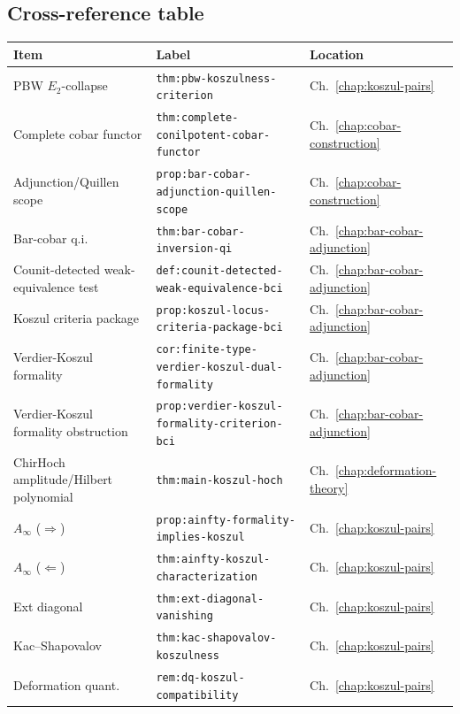 \subsection{Cross-reference table}
\label{subsec:concordance-koszulness-xref}

\begin{center}
\renewcommand{\arraystretch}{1.15}
\begin{tabular}{@{}p{3.6cm}lp{4.5cm}@{}}
\toprule
\textbf{Item} & \textbf{Label} & \textbf{Location} \\
\midrule
PBW $E_2$-collapse
 & \texttt{thm:pbw-koszulness-criterion}
 & Ch.~\ref{chap:koszul-pairs} \\
Complete cobar functor
 & \texttt{thm:complete-conilpotent-cobar-functor}
 & Ch.~\ref{chap:cobar-construction} \\
Adjunction/Quillen scope
 & \texttt{prop:bar-cobar-adjunction-quillen-scope}
 & Ch.~\ref{chap:cobar-construction} \\
Bar-cobar q.i.\
 & \texttt{thm:bar-cobar-inversion-qi}
 & Ch.~\ref{chap:bar-cobar-adjunction} \\
Counit-detected weak-equivalence test
 & \texttt{def:counit-detected-weak-equivalence-bci}
 & Ch.~\ref{chap:bar-cobar-adjunction} \\
Koszul criteria package
 & \texttt{prop:koszul-locus-criteria-package-bci}
 & Ch.~\ref{chap:bar-cobar-adjunction} \\
Verdier-Koszul formality
 & \texttt{cor:finite-type-verdier-koszul-dual-formality}
 & Ch.~\ref{chap:bar-cobar-adjunction} \\
Verdier-Koszul formality obstruction
 & \texttt{prop:verdier-koszul-formality-criterion-bci}
 & Ch.~\ref{chap:bar-cobar-adjunction} \\
ChirHoch amplitude/Hilbert polynomial
 & \texttt{thm:main-koszul-hoch}
 & Ch.~\ref{chap:deformation-theory} \\
$A_\infty$ ($\Rightarrow$)
 & \texttt{prop:ainfty-formality-implies-koszul}
 & Ch.~\ref{chap:koszul-pairs} \\
$A_\infty$ ($\Leftarrow$)
 & \texttt{thm:ainfty-koszul-characterization}
 & Ch.~\ref{chap:koszul-pairs} \\
Ext diagonal
 & \texttt{thm:ext-diagonal-vanishing}
 & Ch.~\ref{chap:koszul-pairs} \\
Kac--Shapovalov
 & \texttt{thm:kac-shapovalov-koszulness}
 & Ch.~\ref{chap:koszul-pairs} \\
Deformation quant.
 & \texttt{rem:dq-koszul-compatibility}
 & Ch.~\ref{chap:koszul-pairs} \\

\end{tabular}
\end{center}
